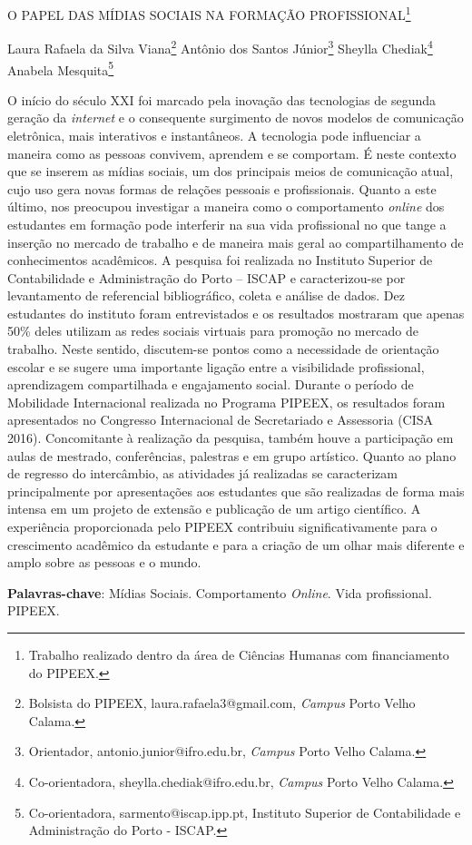 \documentclass[article,12pt,onesidea,4paper,english,brazil]{abntex2}
\begin{document}
	
	
	\frenchspacing 
	
	\begin{center}
		\LARGE O PAPEL DAS MÍDIAS SOCIAIS NA FORMAÇÃO PROFISSIONAL\footnote{Trabalho realizado dentro da área de Ciências Humanas com financiamento do PIPEEX.}
		
		\normalsize
		Laura Rafaela da Silva Viana\footnote{Bolsista do PIPEEX, laura.rafaela3@gmail.com, \textit{Campus} Porto Velho Calama.} 
		Antônio dos Santos Júnior\footnote{Orientador, antonio.junior@ifro.edu.br, \textit{Campus} Porto Velho Calama.} 
		Sheylla Chediak\footnote{Co-orientadora, sheylla.chediak@ifro.edu.br, \textit{Campus} Porto Velho Calama.} 
		Anabela Mesquita\footnote{Co-orientadora, sarmento@iscap.ipp.pt, Instituto Superior de Contabilidade e Administração do Porto - ISCAP.} 
	\end{center}
	
	\noindent O início do século XXI foi marcado pela inovação das tecnologias de segunda
	geração da \textit{internet} e o consequente surgimento de novos modelos de comunicação
	eletrônica, mais interativos e instantâneos. A tecnologia pode influenciar a maneira
	como as pessoas convivem, aprendem e se comportam. É neste contexto que se
	inserem as mídias sociais, um dos principais meios de comunicação atual, cujo uso
	gera novas formas de relações pessoais e profissionais. Quanto a este último, nos
	preocupou investigar a maneira como o comportamento \textit{online} dos estudantes em
	formação pode interferir na sua vida profissional no que tange a inserção no
	mercado de trabalho e de maneira mais geral ao compartilhamento de
	conhecimentos acadêmicos. A pesquisa foi realizada no Instituto Superior de
	Contabilidade e Administração do Porto – ISCAP e caracterizou-se por levantamento
	de referencial bibliográfico, coleta e análise de dados. Dez estudantes do instituto
	foram entrevistados e os resultados mostraram que apenas 50\% deles utilizam as
	redes sociais virtuais para promoção no mercado de trabalho. Neste sentido,
	discutem-se pontos como a necessidade de orientação escolar e se sugere uma
	importante ligação entre a visibilidade profissional, aprendizagem compartilhada e
	engajamento social. Durante o período de Mobilidade Internacional realizada no
	Programa PIPEEX, os resultados foram apresentados no Congresso Internacional
	de Secretariado e Assessoria (CISA 2016). Concomitante à realização da pesquisa,
	também houve a participação em aulas de mestrado, conferências, palestras e em
	grupo artístico. Quanto ao plano de regresso do intercâmbio, as atividades já
	realizadas se caracterizam principalmente por apresentações aos estudantes que
	são realizadas de forma mais intensa em um projeto de extensão e publicação de
	um artigo científico. A experiência proporcionada pelo PIPEEX contribuiu
	significativamente para o crescimento acadêmico da estudante e para a criação de
	um olhar mais diferente e amplo sobre as pessoas e o mundo.
	
	\vspace{\onelineskip}
	
	\noindent
	\textbf{Palavras-chave}: Mídias Sociais. Comportamento \textit{Online}. Vida profissional. PIPEEX.
	
\end{document}

